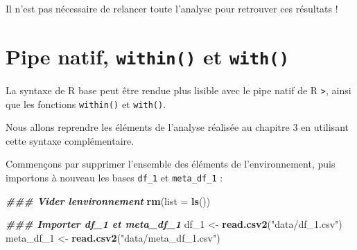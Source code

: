 \documentclass[
]{book}
\newenvironment{Shaded}{\begin{snugshade}}{\end{snugshade}}
\newcommand{\AttributeTok}[1]{\textcolor[rgb]{0.13,0.29,0.53}{#1}}
\newcommand{\CommentTok}[1]{\textcolor[rgb]{0.56,0.35,0.01}{\textit{#1}}}
\newcommand{\DecValTok}[1]{\textcolor[rgb]{0.00,0.00,0.81}{#1}}
\newcommand{\DocumentationTok}[1]{\textcolor[rgb]{0.56,0.35,0.01}{\textbf{\textit{#1}}}}
\newcommand{\FloatTok}[1]{\textcolor[rgb]{0.00,0.00,0.81}{#1}}
\newcommand{\FunctionTok}[1]{\textcolor[rgb]{0.13,0.29,0.53}{\textbf{#1}}}
\newcommand{\NormalTok}[1]{#1}
\newcommand{\OtherTok}[1]{\textcolor[rgb]{0.56,0.35,0.01}{#1}}
\newcommand{\SpecialCharTok}[1]{\textcolor[rgb]{0.81,0.36,0.00}{\textbf{#1}}}
\newcommand{\StringTok}[1]{\textcolor[rgb]{0.31,0.60,0.02}{#1}}
\begin{document}
\begin{Shaded}
\end{Shaded}

Il n'est pas nécessaire de relancer toute l'analyse pour retrouver ces résultats !

\chapter{\texorpdfstring{Pipe natif, \texttt{within()} et \texttt{with()}}{Pipe natif, within() et with()}}\label{pipe-natif-within-et-with}

La syntaxe de R base peut être rendue plus lisible avec le pipe natif de R \texttt{\textbar{}\textgreater{}}, ainsi que les fonctions \texttt{within()} et \texttt{with()}.

Nous allons reprendre les éléments de l'analyse réalisée au chapitre 3 en utilisant cette syntaxe complémentaire.

Commençons par supprimer l'ensemble des éléments de l'environnement, puis importons à nouveau les bases \texttt{df\_1} et \texttt{meta\_df\_1} :

\begin{Shaded}
\begin{Highlighting}[]
\DocumentationTok{\#\#\# Vider l\textquotesingle{}environnement}
\FunctionTok{rm}\NormalTok{(}\AttributeTok{list =} \FunctionTok{ls}\NormalTok{())}

\DocumentationTok{\#\#\# Importer df\_1 et meta\_df\_1}
\NormalTok{df\_1 }\OtherTok{\textless{}{-}} \FunctionTok{read.csv2}\NormalTok{(}\StringTok{"data/df\_1.csv"}\NormalTok{)}
\NormalTok{meta\_df\_1 }\OtherTok{\textless{}{-}} \FunctionTok{read.csv2}\NormalTok{(}\StringTok{"data/meta\_df\_1.csv"}\NormalTok{)}
\end{Highlighting}
\end{Shaded}
\end{document}

